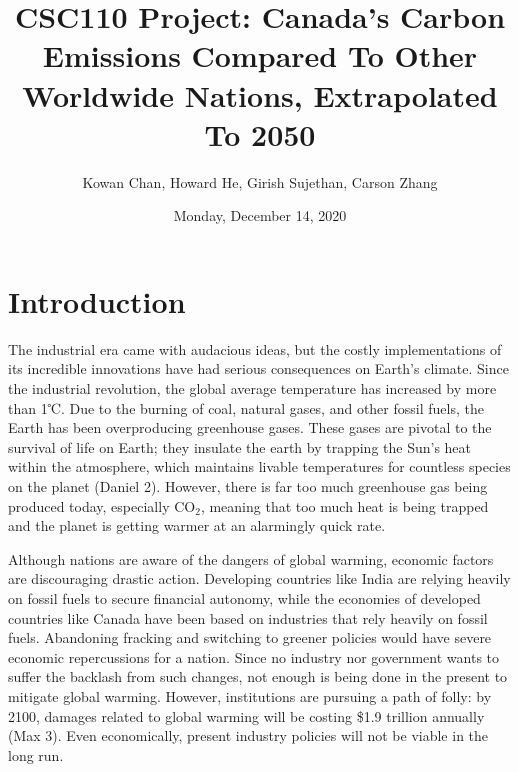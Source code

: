 \documentclass[fontsize=11pt]{article}
\title{CSC110 Project: Canada's Carbon Emissions Compared To Other Worldwide Nations, Extrapolated To 2050}
\author{Kowan Chan, Howard He, Girish Sujethan, Carson Zhang}
\date{Monday, December 14, 2020}
\begin{document}
    \maketitle

    \section*{Introduction}
    The industrial era came with audacious ideas, but the costly implementations of its incredible innovations have had serious consequences on Earth’s climate. Since the industrial revolution, the global average temperature has increased by more than 1℃. Due to the burning of coal, natural gases, and other fossil fuels, the Earth has been overproducing greenhouse gases. These gases are pivotal to the survival of life on Earth; they insulate the earth by trapping the Sun’s heat within the atmosphere, which maintains livable temperatures for countless species on the planet (Daniel 2). However, there is far too much greenhouse gas being produced today, especially CO$_2$, meaning that too much heat is being trapped and the planet is getting warmer at an alarmingly quick rate.

    Although nations are aware of the dangers of global warming, economic factors are discouraging drastic action. Developing countries like India are relying heavily on fossil fuels to secure financial autonomy, while the economies of developed countries like Canada have been based on industries that rely heavily on fossil fuels. Abandoning fracking and switching to greener policies would have severe economic repercussions for a nation. Since no industry nor government wants to suffer the backlash from such changes, not enough is being done in the present to mitigate global warming. However, institutions are pursuing a path of folly: by 2100, damages related to global warming will be costing \$1.9 trillion annually (Max 3). Even economically, present industry policies will not be viable in the long run.
\end{document}
